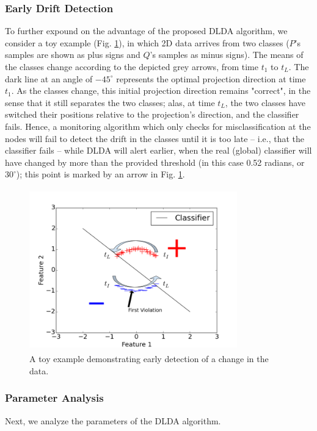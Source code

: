 \subsubsection{Early Drift Detection}\label{sec:earlydetection}
%
%
To further expound on the advantage of the proposed DLDA algorithm, we consider a toy example (Fig. \ref{EarlyDetection}), 
in which 2D data arrives from two classes ($P$'s samples are shown as plus signs and $Q$'s samples as minus signs). The means of the classes change 
according to the depicted grey arrows, from time $t_1$ to $t_L$. The dark
line at an angle of $-45^{\circ}$ represents the optimal projection
direction at time $t_1$. As the classes change, this initial projection
direction remains "correct", in the sense that it still separates the
two classes; alas, at time $t_L$, the two classes have switched their
positions relative to the projection's direction, and the classifier
fails. Hence, a monitoring algorithm which only checks for misclassification
at the nodes will fail to detect the drift in the classes until it is too
late -- i.e., that the classifier fails -- while DLDA will alert earlier, 
when the real (global) classifier will have changed by more than the
provided threshold (in this case 0.52 radians, or $30^{\circ}$); this point is marked by an arrow in Fig. \ref{EarlyDetection}.
%
\begin{figure}[ht]
	\centering
	\includegraphics[width=90mm, height=7cm]{graphics/LDA/EarlyDetection.png}
	\caption{A toy example demonstrating early detection of a change in the data.}
	\label{EarlyDetection}
\end{figure}
%
%
\subsubsection{Parameter Analysis}\label{sec:paramanal}
Next, we analyze the parameters of the DLDA algorithm.

